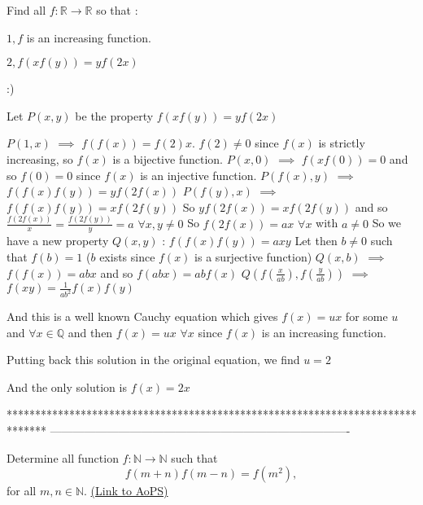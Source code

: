 \begin{mysolution}
	\begin{tcolorbox}Find all $ f:\mathbb{R}\to\mathbb{R}$ so that :

$ 1,f$ is an increasing function.

$ 2,f(xf(y)) = yf(2x)$

 :)\end{tcolorbox}

Let $ P(x,y)$ be the property $ f(xf(y)) = yf(2x)$

$ P(1,x)$  $ \implies$ $ f(f(x))=f(2)x$. $ f(2)\neq 0$ since $ f(x)$ is strictly increasing, so $ f(x)$ is a bijective function.
$ P(x,0)$ $ \implies$ $ f(xf(0))=0$ and so $ f(0)=0$ since $ f(x)$ is an injective function.
$ P(f(x),y)$ $ \implies$ $ f(f(x)f(y))=yf(2f(x))$
$ P(f(y),x)$ $ \implies$ $ f(f(x)f(y))=xf(2f(y))$
So $ yf(2f(x))=xf(2f(y))$ and so $ \frac{f(2f(x))}{x}=\frac{f(2f(y))}{y}=a$ $ \forall x,y\neq 0$
So $ f(2f(x))=ax$ $ \forall x$ with $ a\neq 0$
So we have a new property $ Q(x,y)$ : $ f(f(x)f(y))=axy$
Let then $ b\neq 0$ such that $ f(b)=1$ ($ b$ exists since $ f(x)$ is a surjective function)
$ Q(x,b)$ $ \implies$ $ f(f(x))=abx$ and so $ f(abx)=abf(x)$
$ Q(f(\frac{x}{ab}),f(\frac{y}{ab}))$ $ \implies$ $ f(xy)=\frac{1}{ab^{2}}f(x)f(y)$

And this is a well known Cauchy equation which gives $ f(x)=ux$ for some $ u$ and $ \forall x\in\mathbb{Q}$ and then $ f(x)=ux$ $ \forall x$ since $ f(x)$ is an increasing function.

Putting back this solution in the original equation, we find $ u=2$

And the only solution is $ f(x)=2x$
\end{mysolution}
*******************************************************************************
-------------------------------------------------------------------------------

\begin{problem}
	Determine all function $f: \mathbb N \to \mathbb N$ such that
\[f(m+n)f(m-n) = f(m^{2}),\]
for all $m,n \in  \mathbb N$.
	\flushright \href{https://artofproblemsolving.com/community/c6h166607}{(Link to AoPS)}
\end{problem}



